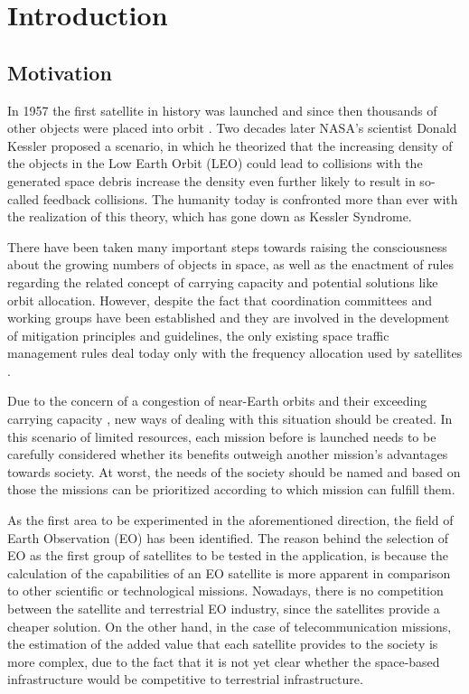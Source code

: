\chapter{Introduction}
\label{chap:1}

\section{Motivation}
\label{chap:1.1}
\bigskip
\bigskip

In 1957 the first satellite in history was launched and since then thousands of other objects were placed into orbit \cite{Belward 2015, ESA 2020}. Two decades later NASA’s scientist Donald Kessler proposed a scenario, in which he theorized that the increasing density of the objects in the Low Earth Orbit (LEO) could lead to collisions with the generated space debris increase the density even further likely to result in so-called feedback collisions. The humanity today is confronted more than ever with the realization of this theory, which has gone down as Kessler Syndrome.

There have been taken many important steps towards raising the consciousness about the growing numbers of objects in space, as well as the enactment of rules regarding the related concept of carrying capacity and potential solutions like orbit allocation. However, despite the fact that coordination committees and working groups have been established and they are involved in the development of mitigation principles and guidelines, the only existing space traffic management rules deal today only with the frequency allocation used by satellites \cite{Griffin}. %

Due to the concern of a congestion of near-Earth orbits and their exceeding carrying capacity \cite{Somma 2019}, new ways of dealing with this situation should be created. In this scenario of limited resources, each mission before is launched needs to be carefully considered whether its benefits outweigh another mission's advantages towards society. At worst, the needs of the society should be named and based on those the missions can be prioritized according to which mission can fulfill them.

As the first area to be experimented in the aforementioned direction, the field of Earth Observation (EO) has been identified. The reason behind the selection of EO as the first group of satellites to be tested in the application, is because the calculation of the capabilities of an EO satellite is more apparent in comparison to other scientific or technological missions. Nowadays, there is no competition between the satellite and terrestrial EO industry, since the satellites provide a cheaper solution. On the other hand, in the case of telecommunication missions, the estimation of the added value that each satellite provides to the society is more complex, due to the fact that it is not yet clear whether the space-based infrastructure would be competitive to terrestrial infrastructure.

